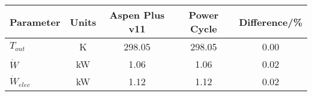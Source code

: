 \begin{tabular}{|p{2.5cm} c c c c|}
    \hline
    \rowcolor{bluepoli!40} %
    \textbf{Parameter} & \textbf{Units} & \textbf{Aspen Plus v11} & \textbf{Power Cycle} & \textbf{Difference/\unit{\percent}} \T\B \\
    \hline \hline
    \(T_{out}\) & \unit{\K} & 298.05 & 298.05 & 0.00 \T\B\\
    \(\Dot{W}\) & \unit{\kilo\watt} & 1.06 & 1.06 & 0.02 \T\B\\
    \(\Dot{W}_{elec}\) & \unit{\kilo\watt} & 1.12 & 1.12 & 0.02 \T\B\\
    \hline
\end{tabular}